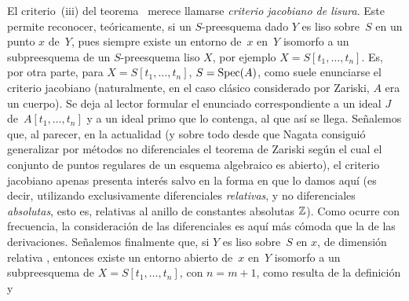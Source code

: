 
\begin{remarques}
\label{II.4.14}
El criterio~(iii) del teorema~ merece llamarse \emph{criterio jacobiano de lisura}.
%
%
%
Este permite reconocer, teóricamente, si un $S$-preesquema dado $Y$ es liso sobre~$S$ en un punto $x$ de~$Y$, pues siempre existe un entorno de~$x$ en~$Y$ isomorfo a un subpreesquema de un $S$-preesquema liso $X$, por ejemplo $X=S[t_1,\dots,t_n]$. Es, por otra parte, para $X=S[t_1,\dots,t_n]$, $S=\operatorname{Spec}(A)$, como suele enunciarse el criterio jacobiano (naturalmente, en el caso clásico considerado por Zariski, $A$ era
un cuerpo). Se deja al lector formular el enunciado correspondiente a un ideal $J$ de~$A[t_1,\dots,t_n]$ y a un ideal primo que lo contenga, al que así se llega. Señalemos que, al parecer, en la actualidad (y sobre todo desde que Nagata consiguió generalizar por métodos no diferenciales el teorema de Zariski según el cual el conjunto de puntos regulares de un esquema algebraico es abierto), el criterio jacobiano apenas presenta interés salvo en la forma en que lo damos aquí (es decir, utilizando exclusivamente diferenciales \emph{relativas}, y no diferenciales \emph{absolutas}, esto es, relativas al anillo de constantes absolutas $\mathbb Z$). Como ocurre con frecuencia, la consideración de las diferenciales es aquí más cómoda que la de las derivaciones. Señalemos finalmente que, si $Y$ es liso sobre~$S$ en $x$, de dimensión relativa
,
entonces existe un entorno abierto de~$x$ en~$Y$ isomorfo a un subpreesquema de $X=S[t_1,\dots,t_n]$, con $n=m+1$, como resulta de la definición y


\end{remarques}
